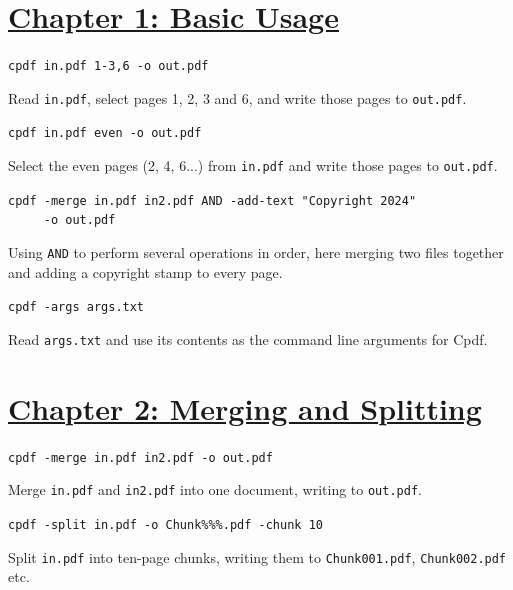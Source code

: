 \documentclass{book}
\begin{document}
\section*{\hyperref[chap:1]{Chapter 1: Basic Usage}}

\begin{framed}\noindent\texttt{cpdf in.pdf 1-3,6 -o out.pdf}\end{framed}

\noindent Read \texttt{in.pdf}, select pages 1, 2, 3 and 6, and write those pages to \texttt{out.pdf}.


\begin{framed}\noindent\texttt{cpdf in.pdf even -o out.pdf}\end{framed}
                  
\noindent Select the even pages (2, 4, 6...) from \texttt{in.pdf} and write those pages to \texttt{out.pdf}.

\begin{framed}
 \noindent\small\verb?cpdf -merge in.pdf in2.pdf AND -add-text "Copyright 2024"?\\
 \noindent\small\verb?     -o out.pdf?
\end{framed}

\noindent Using \texttt{AND} to perform several operations in order, here merging two files together and adding a copyright stamp to every page.

\begin{framed}\noindent\texttt{cpdf -args args.txt}\end{framed}

\noindent Read \texttt{args.txt} and use its contents as the command line arguments for Cpdf.

\section*{\hyperref[chap:2]{Chapter 2: Merging and Splitting}}

\begin{framed}\noindent\texttt{cpdf -merge in.pdf in2.pdf -o out.pdf}\end{framed}

\noindent Merge \texttt{in.pdf} and \texttt{in2.pdf} into one document, writing to \texttt{out.pdf}.

\begin{framed}\noindent\texttt{cpdf -split in.pdf -o Chunk\%\%\%.pdf -chunk 10}\end{framed}

\noindent Split \texttt{in.pdf} into ten-page chunks, writing them to \texttt{Chunk001.pdf}, \texttt{Chunk002.pdf} etc.
\end{document}
